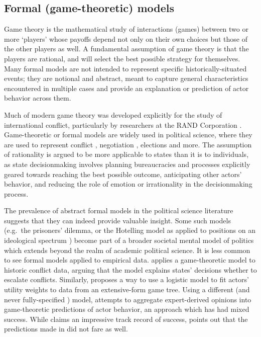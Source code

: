 \subsection{Formal (game-theoretic) models}\label{formal-game-theoretic-models}

Game theory is the mathematical study of interactions (games) between two or more `players' whose payoffs depend not only on their own choices but those of the other players as well. A fundamental assumption of game theory is that the players are rational, and will select the best possible strategy for themselves. Many formal models are not intended to represent specific historically-situated events; they are notional and abstract, meant to capture general characteristics encountered in multiple cases and provide an explanation or prediction of actor behavior across them.

Much of modern game theory was developed explicitly for the study of international conflict, particularly by researchers at the RAND Corporation \citep{gates_1997}. Game-theoretic or formal models are widely used in political science, where they are used to represent conflict \citep{powell_2006}, negotiation \citep{brams_2003}, elections \citep{coughlin_1981} and more. The assumption of rationality is argued to be more applicable to states than it is to individuals, as state decisionmaking involves planning bureaucracies and processes explicitly geared towards reaching the best possible outcome, anticipating other actors' behavior, and reducing the role of emotion or irrationality in the decisionmaking process.

The prevalence of abstract formal models in the political science literature suggests that they can indeed provide valuable insight. Some such models (e.g.~the prisoners' dilemma, or the Hotelling model as applied to positions on an ideological spectrum \citep{stokes_1963}) become part of a broader societal mental model of politics which extends beyond the realm of academic political science. It is less common to see formal models applied to empirical data. \citet{bdm_1988} applies a game-theoretic model to historic conflict data, arguing that the model explains states' decisions whether to escalate conflicts. Similarly, \citet{signorino_1999} proposes a way to use a logistic model to fit actors' utility weights to data from an extensive-form game tree. Using a different (and never fully-specified \citep{scholz_2011}) model, \citet{bdm_1984} attempts to aggregate expert-derived opinions into game-theoretic predictions of actor behavior, an approach which has had mixed success. While \citet{bdm_2010} claims an impressive track record of success, \citet{schrodt_2004} points out that the predictions made in \citet{bdm_1982} did not fare as well.

